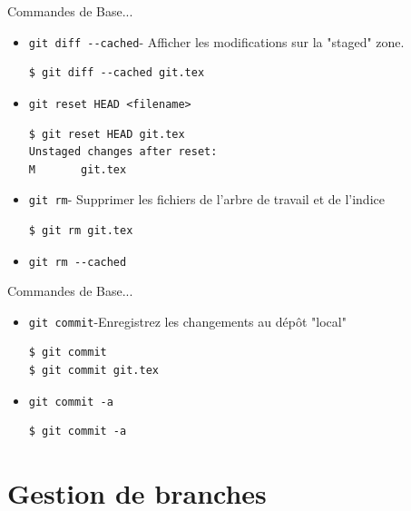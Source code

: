 \documentclass{beamer}
\begin{document}
\begin{frame}[containsverbatim]{Commandes de Base...}
  \begin{itemize}
\item \lstinline|git diff --cached|- Afficher les modifications sur la "staged" zone.
\begin{lstlisting}
$ git diff --cached git.tex
\end{lstlisting}

\item \lstinline|git reset HEAD <filename>| 
\begin{lstlisting}
$ git reset HEAD git.tex
Unstaged changes after reset:
M       git.tex
\end{lstlisting}

\item \lstinline|git rm|- Supprimer les fichiers de l'arbre de travail et de l'indice 
\begin{lstlisting}
$ git rm git.tex
\end{lstlisting}
\item \lstinline|git rm --cached|
    
  \end{itemize}
\end{frame}
\begin{frame}[containsverbatim]{Commandes de Base...}
  \begin{itemize}
\item \lstinline|git commit|-Enregistrez les changements au dépôt "local"
\begin{lstlisting}
$ git commit
$ git commit git.tex
\end{lstlisting}

\item \lstinline|git commit -a| 
\begin{lstlisting}
$ git commit -a
\end{lstlisting}
  
  \end{itemize}
\end{frame}


\section{Gestion de branches}
\end{document}
